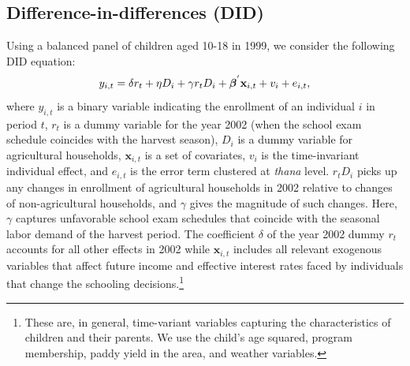 \documentclass[12pt,letterpaper]{article}
\newcommand{\SAdded}[1]{\textcolor{red}{#1}}
\newcommand{\bfbeta}{\ensuremath{\mbox{\boldmath $\beta$}}}
\newcommand{\0}{\ensuremath{\mbox{\boldmath $0$}}}
\begin{document}
\subsection{Difference-in-differences (DID)}

Using a balanced panel of children aged 10-18 in 1999, we consider the following DID equation:
\begin{equation}
y_{i,t} = \delta r_{t} + \eta D_{i} + \gamma r_{t}D_{i} + \bfbeta^{'} \textbf{x}_{i,t} + v_{i} + e_{i,t},
\label{estbase}
\end{equation}
where $y_{i,t}$ is a binary variable indicating the enrollment of an individual $i$ in period $t$, $r_{t}$ is a dummy variable for the year 2002 (when the school exam schedule coincides with the harvest season), $D_{i}$ is a dummy variable for agricultural households, $\textbf{x}_{i,t}$ is a set of covariates,  $v_{i}$ is the time-invariant individual effect, and $e_{i,t}$ is the error term clustered at \textit{thana} level. $r_{t}D_{i}$ picks up any changes in enrollment of agricultural households in 2002 relative to changes of non-agricultural households, and $\gamma$ gives the magnitude of such changes. %
Here, $\gamma$ captures unfavorable school exam schedules that coincide with the seasonal labor demand of the harvest period. The coefficient $\delta$ of the year 2002 dummy $r_{t}$ accounts for all other effects in 2002 while $\textbf{x}_{i,t}$ includes all relevant exogenous variables that affect future income and effective interest rates faced by individuals that change the schooling decisions.\footnote{These are, in general, time-variant variables capturing the characteristics of children and their parents. We use the child’s age squared, program membership, paddy yield in the area, and weather variables. }

\end{document}
